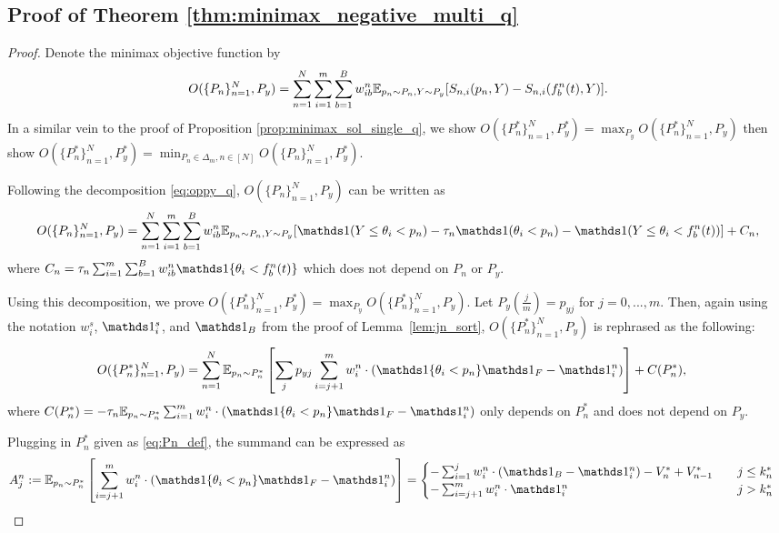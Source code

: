 \subsection{Proof of Theorem \ref{thm:minimax_negative_multi_q}} \label{pf:minimax_negative_multi_q}
\begin{proof}
  Denote the minimax objective function by 
  \[O(\{P_n\}_{n=1}^N, P_y) = \sum_{n=1}^N \sum_{i=1}^{m} \sum_{b=1}^B w_{ib}^n \mathbb{E}_{p_n \sim P_n, Y \sim P_y}[S_{n, i}(p_n,Y) - S_{n,i}(f_b^n(t),Y)].
  \]
  In a similar vein to the proof of Proposition \ref{prop:minimax_sol_single_q}, we show $O(\{P_n^*\}_{n=1}^N, P_y^*) = \max_{P_y} O(\{P_n^*\}_{n=1}^N, P_y)$ then show $O(\{P_n^*\}_{n=1}^N, P_y^*) = \min_{P_n \in \Delta_m, n\in[N]} O(\{P_n\}_{n=1}^N, P_y^*)$.
  
  Following the decomposition \eqref{eq:oppy_q}, $O(\{P_n\}_{n=1}^N, P_y)$ can be written as
  \[
  O(\{P_n\}_{n=1}^N, P_y) = \sum_{n=1}^N \sum_{i=1}^{m} \sum_{b=1}^B w_{ib}^n \E_{p_n \sim P_n, Y \sim P_y}[\one(Y \leq \theta_i < p_n) - \tau_n \one(\theta_i<p_n) - \one(Y \leq \theta_i < f_b^n(t))] + C_n,
  \]
  where $C_n =\tau_n \sum_{i=1}^{m} \sum_{b=1}^B w_{ib}^n \indi{\theta_i < f_b^n(t)}$ which does not depend on $P_n$ or $P_y$.
  
  Using this decomposition, we prove $O(\{P_n^*\}_{n=1}^N, P_y^*) = \max_{P_y} O(\{P_n^*\}_{n=1}^N, P_y)$. Let $P_y(\frac{j}{m})=p_{yj}$ for $j=0,...,m$. Then, again using the notation $w_i^s$, $\one_i^s$, and $\one_B$ from the proof of Lemma~\ref{lem:jn_sort}, $O(\{P_n^*\}_{n=1}^N, P_y)$ is rephrased as the following:
  \begin{align}\label{eq:O_Pstar_Py_decomp}
  O(\{P_n^*\}_{n=1}^N, P_y) 
  & = \sum_{n=1}^N \E_{p_n \sim P_n^*} \left[\sum_j p_{yj} \sum_{i=j+1}^{m} w_i^n \cdot \left( \indi{\theta_i < p_n} \one_F - \one_i^n \right)\right] + C(P_n^*),
  \end{align}
  where $C(P_n^*) = - \tau_n \E_{p_n \sim P_n^*} \sum_{i=1}^{m} w_i^n \cdot (\indi{\theta_i < p_n} \one_F - \one_i^n)$ only depends on $P_n^*$ and does not depend on $P_y$.
  
  Plugging in $P_n^*$ given as \eqref{eq:Pn_def}, the summand can be expressed as 
  \begin{align*}
  A_j^n := \E_{p_n \sim P_n^*} & \left[\sum_{i=j+1}^{m} w_i^n \cdot \left( \indi{\theta_i < p_n} \one_F - \one_i^n\right)\right] 
  = \begin{cases}
  -\sum_{i=1}^{j} w_i^n \cdot (\one_B-\one_i^n) - V_n^* + V_{n-1}^* & \quad j \leq k_n^* \\
  - \sum_{i=j+1}^{m} w_i^n \cdot \one_i^n & \quad j > k_n^* \\
  \end{cases} 
  \end{align*}
  

\end{proof}
